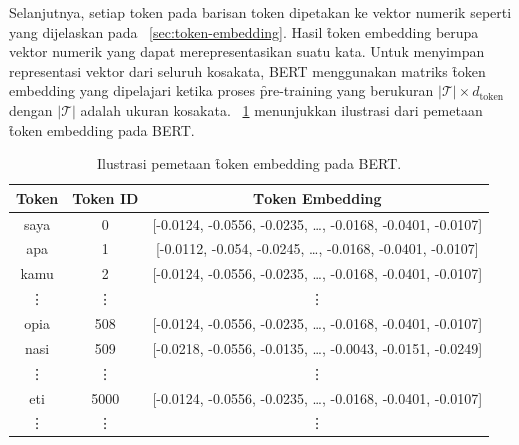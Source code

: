 Selanjutnya, setiap token pada barisan token dipetakan ke vektor numerik seperti yang dijelaskan pada \sect~\ref{sec:token-embedding}. Hasil \f{token embedding} berupa vektor numerik yang dapat merepresentasikan suatu kata. Untuk menyimpan representasi vektor dari seluruh kosakata, BERT menggunakan matriks \f{token embedding} yang dipelajari ketika proses \f{pre-training} yang berukuran $|\mathcal{T}| \times d_{\text{token}}$ dengan $|\mathcal{T}|$ adalah ukuran kosakata. \tab~\ref{tab:token-embeddings} menunjukkan ilustrasi dari pemetaan \f{token embedding} pada BERT.
\begin{table}
	\centering
	\caption{Ilustrasi pemetaan \f{token embedding} pada BERT.}
	\label{tab:token-embeddings}
	\begin{tabular}{|c|c|c|}
		\hline
		\textbf{Token} & \textbf{Token ID} & \textbf{\f{Token Embedding}} \\
		\hline
		saya & 0 & [-0.0124, -0.0556, -0.0235, \dots, -0.0168, -0.0401, -0.0107] \\
		apa & 1 & [-0.0112, -0.054, -0.0245, \dots, -0.0168, -0.0401, -0.0107] \\
		kamu & 2 & [-0.0124, -0.0556, -0.0235, \dots, -0.0168, -0.0401, -0.0107] \\
		\vdots & \vdots & \vdots \\
		opia & 508 & [-0.0124, -0.0556, -0.0235, \dots, -0.0168, -0.0401, -0.0107] \\
		nasi & 509 & [-0.0218, -0.0556, -0.0135, \dots, -0.0043, -0.0151, -0.0249] \\
		\vdots & \vdots & \vdots \\
		eti & 5000 & [-0.0124, -0.0556, -0.0235, \dots, -0.0168, -0.0401, -0.0107] \\
		\vdots & \vdots & \vdots \\
		\hline
	\end{tabular}
\end{table}

